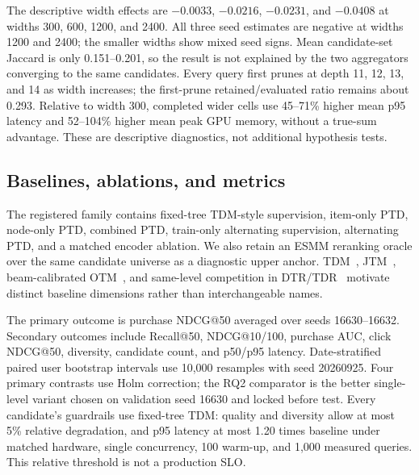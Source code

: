 \documentclass[sigconf,natbib=true]{acmart}
\begin{document}
The descriptive width effects are $-0.0033$, $-0.0216$, $-0.0231$, and $-0.0408$ at widths 300, 600, 1200, and 2400. All three seed estimates are negative at widths 1200 and 2400; the smaller widths show mixed seed signs. Mean candidate-set Jaccard is only 0.151--0.201, so the result is not explained by the two aggregators converging to the same candidates. Every query first prunes at depth 11, 12, 13, and 14 as width increases; the first-prune retained/evaluated ratio remains about 0.293. Relative to width 300, completed wider cells use 45--71\% higher mean p95 latency and 52--104\% higher mean peak GPU memory, without a true-sum advantage. These are descriptive diagnostics, not additional hypothesis tests.



\subsection{Baselines, ablations, and metrics}
The registered family contains fixed-tree TDM-style supervision, item-only PTD, node-only PTD, combined PTD, train-only alternating supervision, alternating PTD, and a matched encoder ablation. We also retain an ESMM reranking oracle over the same candidate universe as a diagnostic upper anchor. TDM~\citep{zhu2018tdm}, JTM~\citep{zhu2019jtm}, beam-calibrated OTM~\citep{zhuo2020otm}, and same-level competition in DTR/TDR~\citep{liu2024dtr} motivate distinct baseline dimensions rather than interchangeable names.

The primary outcome is purchase NDCG@50 averaged over seeds 16630--16632. Secondary outcomes include Recall@50, NDCG@10/100, purchase AUC, click NDCG@50, diversity, candidate count, and p50/p95 latency. Date-stratified paired user bootstrap intervals use 10,000 resamples with seed 20260925. Four primary contrasts use Holm correction; the RQ2 comparator is the better single-level variant chosen on validation seed 16630 and locked before test. Every candidate's guardrails use fixed-tree TDM: quality and diversity allow at most 5\% relative degradation, and p95 latency at most 1.20 times baseline under matched hardware, single concurrency, 100 warm-up, and 1,000 measured queries. This relative threshold is not a production SLO.
\end{document}
